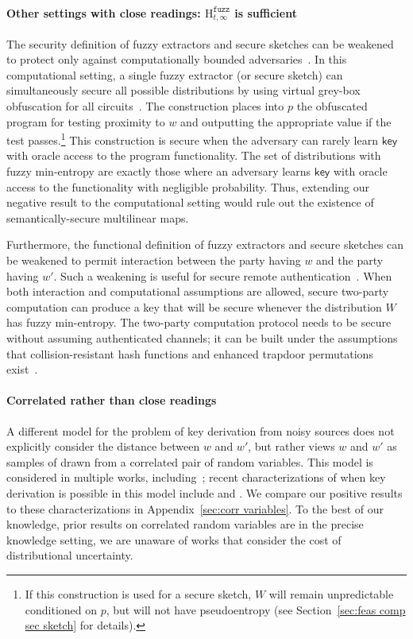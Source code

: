 \documentclass[11pt]{article}
\newcommand{\secref}[1]{\mbox{Section~\ref{#1}}}
\newcommand{\apref}[1]{\mbox{Appendix~\ref{#1}}}
\newcommand{\class}[1]{{\ensuremath{\mathsf{#1}}}}
\newcommand{\key}{\ensuremath{\class{key}}\xspace}
\newcommand{\Hfuzz}{\mathrm{H}^{\mathtt{fuzz}}_{t,\infty}}
\begin{document}
\paragraph{Other settings with close readings:  $\Hfuzz$ is sufficient}
The security definition of fuzzy extractors and secure sketches can be weakened to protect only against computationally bounded adversaries~\cite{fuller2013computational}.   In this computational setting, a single fuzzy extractor (or secure sketch) can simultaneously secure all possible distributions by using virtual grey-box obfuscation for all circuits~\cite{BitanskyCKP14}. The construction places into $p$ the obfuscated program for testing proximity to $w$ and outputting the appropriate value if the test passes.\footnote{If this construction is used for a secure sketch, $W$ will remain unpredictable conditioned on $p$, but will not have pseudoentropy (see  \secref{sec:feas comp sec sketch} for details).}  This construction is secure when the adversary can rarely learn \key with oracle access to the program functionality.  The set of distributions with fuzzy min-entropy are exactly those where an adversary learns \key with oracle access to the functionality with negligible probability. Thus, extending our negative result to the computational setting would rule out the existence of semantically-secure multilinear maps.

Furthermore, the functional definition of fuzzy extractors and secure sketches can be weakened to permit interaction between the party having $w$ and the party having $w'$. Such a weakening is useful for secure remote authentication~\cite{Boyen05secureremote}. When both interaction and computational assumptions are allowed, secure two-party computation can produce a key that will be secure whenever the distribution $W$ has fuzzy min-entropy.  The two-party computation protocol needs to be secure without assuming authenticated channels; it can be built under the assumptions that collision-resistant hash functions and enhanced trapdoor permutations exist~\cite{DBLP:journals/joc/BarakCLPR11}.

\paragraph{Correlated rather than close readings}
A different model for the problem of key derivation from noisy sources does not explicitly consider the distance between $w$ and $w'$, but rather views $w$ and $w'$ as samples of drawn from a correlated pair of random variables.   This model is considered in multiple works, including~\cite{wyner1975wire,DBLP:journals/tit/CsiszarK78,DBLP:journals/tit/AhlswedeC93,DBLP:journals/tit/Maurer93}; recent characterizations of when key derivation is possible in this model include \cite{DBLP:conf/asiacrypt/RennerW05} and \cite{DBLP:journals/corr/TyagiW14}.  We compare our positive results to these characterizations in \apref{sec:corr variables}.  To the best of our knowledge, prior results on correlated random variables are in the precise knowledge setting, we are unaware of works that consider the cost of distributional uncertainty.
\end{document}
